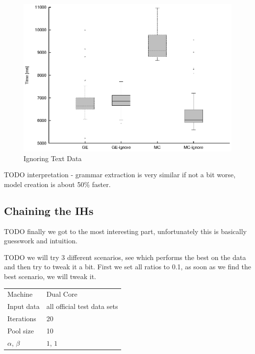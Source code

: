 \begin{figure}
  \caption{Ignoring Text Data}
  \label{image-experiment-ignore-text-data}
  \centering
    \includegraphics[width=\textwidth]{images/experiments/ignore-text-data}
\end{figure}

TODO interpretation - grammar extraction is very similar if not a bit worse, model creation is about 50\% faster.

\subsection{Chaining the IHs}


TODO finally we got to the most interesting part, unfortunately this is basically guesswork and intuition.

TODO we will try 3 different scenarios, see which performs the best on the data and then try to tweak it a bit. First we set all ratios to 0.1, as soon as we find the best scenario, we will tweak it.

\begin{center}
\bigskip
\begin{tabular}{| l | l |}
  \hline
  \hline
  Machine           & Dual Core \\
  Input data        & all official test data sets \\
  Iterations        & 20 \\
  Pool size         & 10 \\
  $\alpha$, $\beta$ & $1$, $1$ \\
  \hline
\end{tabular}
\bigskip
\end{center}

